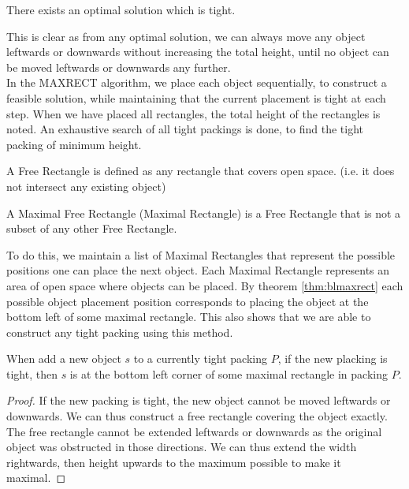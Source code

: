 \documentclass{article}
\begin{document}
\begin{thm}
There exists an optimal solution which is tight.
\end{thm}
This is clear as from any optimal solution, we can always move any object leftwards or downwards without increasing the total height, until no object can be moved leftwards or downwards any further.\\

In the MAXRECT algorithm, we place each object sequentially, to construct a feasible solution, while maintaining that the current placement is tight at each step. When we have placed all rectangles, the total height of the rectangles is noted. An exhaustive search of all tight packings is done, to find the tight packing of minimum height.

\begin{defn}
A Free Rectangle is defined as any rectangle that covers open space. (i.e. it does not intersect any existing object)
\end{defn}

\begin{defn}
A Maximal Free Rectangle (Maximal Rectangle) is a Free Rectangle that is not a subset of any other Free Rectangle.
\end{defn}

To do this, we maintain a list of Maximal Rectangles that represent the possible positions one can place the next object. Each Maximal Rectangle represents an area of open space where objects can be placed. By theorem \ref{thm:blmaxrect} each possible object placement position corresponds to placing the object at the bottom left of some maximal rectangle. This also shows that we are able to construct any tight packing using this method.

\begin{thm}
\label{thm:blmaxrect}
When add a new object $s$ to a currently tight packing $P$, if the new placking is tight, then $s$ is at the bottom left corner of some maximal rectangle in packing $P$.
\end{thm}
\begin{proof}
If the new packing is tight, the new object cannot be moved leftwards or downwards. We can thus construct a free rectangle covering the object exactly. The free rectangle cannot be extended leftwards or downwards as the original object was obstructed in those directions. We can thus extend the width rightwards, then height upwards to the maximum possible to make it maximal.
\end{proof}
\end{document}
